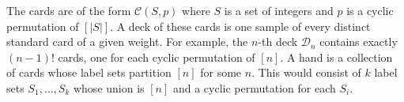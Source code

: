 \documentclass[11pt]{article}
\renewcommand{\>}{\rangle}
\newcommand{\<}{\langle}
\let \mc \mathcal
\begin{document}
\begin{example}[Permutations] The cards are of the form $\mc C(S, p)$ where $S$ is a set of integers and $p$ is a cyclic permutation of $[|S|]$.  A deck of these cards is one sample of every distinct standard card of a given weight.  For example, the $n$-th deck $\mc D_n$ contains exactly $(n-1)!$ cards, one for each cyclic permutation of $[n]$.  A hand is a collection of cards whose label sets partition $[n]$ for some $n$. This would consist of $k$ label sets $S_1, \dots, S_k$ whose union is $[n]$ and a cyclic permutation for each $S_i$.
\end{example}



 
\end{document}

